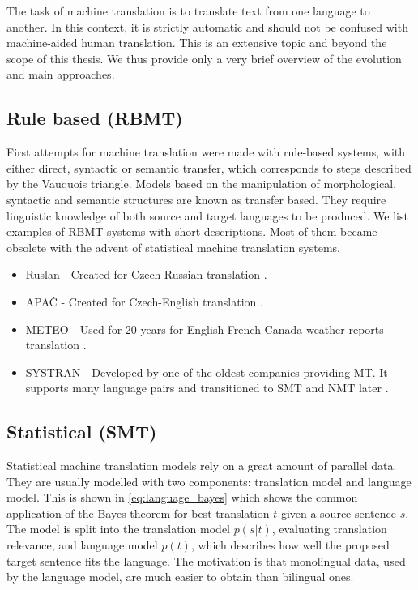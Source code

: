 The task of machine translation is to translate text from one language to another. In this context, it is strictly automatic and should not be confused with machine-aided human translation. This is an extensive topic and beyond the scope of this thesis. We thus provide only a very brief overview of the evolution and main approaches.

\subsection{Rule based (RBMT)}

First attempts for machine translation were made with rule-based systems, with either direct, syntactic or semantic transfer, which corresponds to steps described by the Vauquois triangle. Models based on the manipulation of morphological, syntactic and semantic structures are known as transfer based. They require linguistic knowledge of both source and target languages to be produced. We list examples of RBMT systems with short descriptions. Most of them became obsolete with the advent of statistical machine translation systems.

\begin{itemize}
    \item Ruslan - Created for Czech-Russian translation \citep{ruslan}.
    \item APAČ - Created for Czech-English translation \citep{apac}.
    \item METEO - Used for 20 years for English-French Canada weather reports translation \citep{meteo}.
    \item SYSTRAN - Developed by one of the oldest companies providing MT. It supports many language pairs and transitioned to SMT and NMT later \citep{systran}.
\end{itemize}

\subsection{Statistical (SMT)}
\label{subsec:smt}

Statistical machine translation models rely on a great amount of parallel data. They are usually modelled with two components: translation model and language model. This is shown in \autoref{eq:language_bayes} which shows the common application of the Bayes theorem for best translation $t$ given a source sentence $s$. The model is split into the translation model $p(s|t)$, evaluating translation relevance, and language model $p(t)$, which describes how well the proposed target sentence fits the language. The motivation is that monolingual data, used by the language model, are much easier to obtain than bilingual ones.

